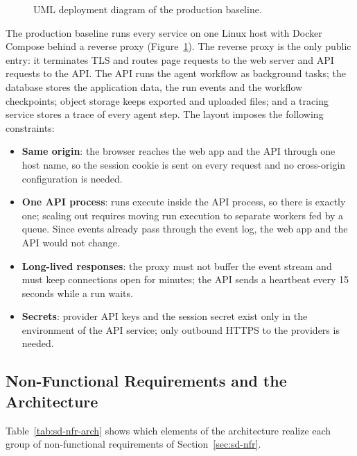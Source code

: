 \begin{figure}[H]
    \centering
    \resizebox{\linewidth}{!}{}
    \caption{UML deployment diagram of the production baseline.}
    \label{fig:sd-deployment}
\end{figure}
The production baseline runs every service on one Linux host with Docker Compose behind a reverse proxy (Figure~\ref{fig:sd-deployment}). The reverse proxy is the only public entry: it terminates TLS and routes page requests to the web server and API requests to the API. The API runs the agent workflow as background tasks; the database stores the application data, the run events and the workflow checkpoints; object storage keeps exported and uploaded files; and a tracing service stores a trace of every agent step. The layout imposes the following constraints:
\begin{itemize}
    \item \textbf{Same origin}: the browser reaches the web app and the API through one host name, so the session cookie is sent on every request and no cross-origin configuration is needed.
    \item \textbf{One API process}: runs execute inside the API process, so there is exactly one; scaling out requires moving run execution to separate workers fed by a queue. Since events already pass through the event log, the web app and the API would not change.
    \item \textbf{Long-lived responses}: the proxy must not buffer the event stream and must keep connections open for minutes; the API sends a heartbeat every 15 seconds while a run waits.
    \item \textbf{Secrets}: provider API keys and the session secret exist only in the environment of the API service; only outbound HTTPS to the providers is needed.
\end{itemize}

\subsection{Non-Functional Requirements and the Architecture}
\label{sec:sd-nfr-architecture}

Table~\ref{tab:sd-nfr-arch} shows which elements of the architecture realize each group of non-functional requirements of Section~\ref{sec:sd-nfr}.

